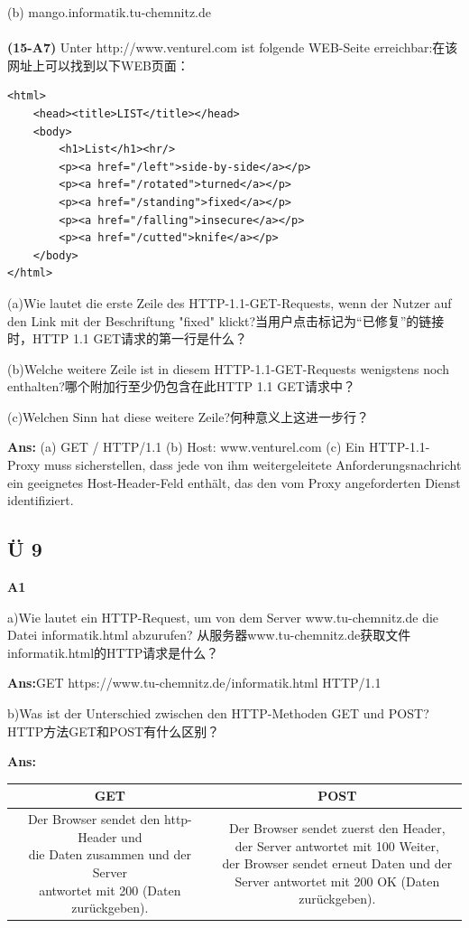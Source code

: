\documentclass[fleqn]{article}
\begin{document}
(b) mango.informatik.tu-chemnitz.de
\\
\\
\noindent\textbf{(15-A7)} Unter http://www.venturel.com ist folgende WEB-Seite erreichbar:在该网址上可以找到以下WEB页面：

\begin{lstlisting}
<html>
    <head><title>LIST</title></head>
    <body>
        <h1>List</h1><hr/>
        <p><a href="/left">side-by-side</a></p> 
        <p><a href="/rotated">turned</a></p> 
        <p><a href="/standing">fixed</a></p> 
        <p><a href="/falling">insecure</a></p> 
        <p><a href="/cutted">knife</a></p>
    </body>
</html>
\end{lstlisting}

(a)Wie lautet die erste Zeile des HTTP-1.1-GET-Requests, wenn der Nutzer auf den Link mit der Beschriftung "fixed" klickt?当用户点击标记为“已修复”的链接时，HTTP 1.1 GET请求的第一行是什么？

(b)Welche weitere Zeile ist in diesem HTTP-1.1-GET-Requests wenigstens noch enthalten?哪个附加行至少仍包含在此HTTP 1.1 GET请求中？

(c)Welchen Sinn hat diese weitere Zeile?何种意义上这进一步行？

\textbf{Ans:} (a) GET / HTTP/1.1 \qquad (b) Host: www.venturel.com \qquad (c) Ein HTTP-1.1-Proxy muss sicherstellen, dass jede von ihm weitergeleitete Anforderungsnachricht ein geeignetes Host-Header-Feld enthält, das den vom Proxy angeforderten Dienst identifiziert.

\subsection{Ü 9}

\noindent\textbf{A1}

a)Wie lautet ein HTTP-Request, um von dem Server  www.tu-chemnitz.de  die  Datei informatik.html abzurufen? 
从服务器www.tu-chemnitz.de获取文件informatik.html的HTTP请求是什么？

\textbf{Ans:}GET https://www.tu-chemnitz.de/informatik.html HTTP/1.1

b)Was ist der Unterschied zwischen den HTTP-Methoden GET und POST? HTTP方法GET和POST有什么区别？

\textbf{Ans:}
\begin{center}
    \begin{tabular}{c|c}
        GET&POST\\
        \hline
        \shortstack[l]{Der Browser sendet den http-Header und \\
        die Daten zusammen und der Server\\
         antwortet mit 200 (Daten zurückgeben).}&\shortstack{Der Browser sendet zuerst den Header, \\
         der Server antwortet mit 100 Weiter, \\
         der Browser sendet erneut Daten und der \\
         Server antwortet mit 200 OK (Daten zurückgeben).}
        
    \end{tabular}
\end{center}
\end{document}

